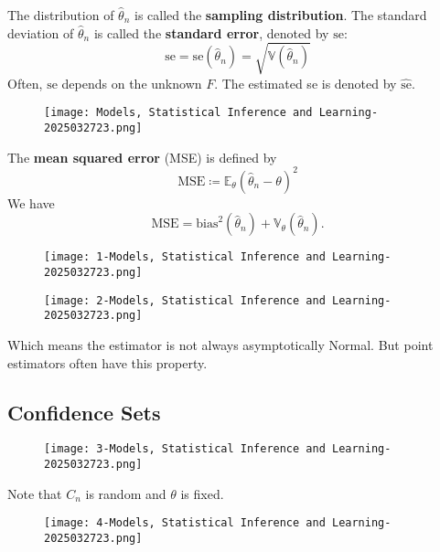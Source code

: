 The distribution of $\widehat{\theta}_n$ is called the \textbf{sampling distribution}. The standard deviation of $\widehat{\theta}_n$ is called the \textbf{standard error}, denoted by $\text{se}$:
\[
\text{se}=\text{se}(\widehat{\theta}_n)=\sqrt{ \mathbb{V}(\widehat{\theta}_n) }
\]
Often, $\text{se}$ depends on the unknown $F$. The estimated se is denoted by $\widehat{\text{se}}$.

\begin{figure}[H]
\centering
\texttt{[image: Models, Statistical Inference and Learning-2025032723.png]}
\label{}
\end{figure}

The \textbf{mean squared error} (MSE) is defined by
\[
\text{MSE}\coloneqq \mathbb{E}_{\theta}(\widehat{\theta}_n-\theta)^2
\]
We have
\[
\text{MSE}=\text{bias}^2(\widehat{\theta}_n)+\mathbb{V}_{\theta}(\widehat{\theta}_n).
\]
\begin{figure}[H]
\centering
\texttt{[image: 1-Models, Statistical Inference and Learning-2025032723.png]}
\label{}
\end{figure}

\begin{figure}[H]
\centering
\texttt{[image: 2-Models, Statistical Inference and Learning-2025032723.png]}
\label{}
\end{figure}
Which means the estimator is not always asymptotically Normal. But point estimators often have this property.

\subsection{Confidence Sets}

\begin{figure}[H]
\centering
\texttt{[image: 3-Models, Statistical Inference and Learning-2025032723.png]}
\label{}
\end{figure}

\begin{note}
Note that $C_n$ is random and $\theta$ is fixed.
\end{note}
\begin{remark}
\begin{figure}[H]
\centering
\texttt{[image: 4-Models, Statistical Inference and Learning-2025032723.png]}
\label{}
\end{figure}
\end{remark}
